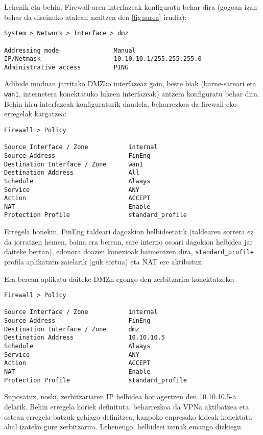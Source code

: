 Lehenik eta behin, Firewall-aren interfazeak konfiguratu behar dira (gogoan izan behar da diseinuko atalean azaltzen den \ref{fig:sarea} irudia):

\begin{verbatim}
System > Network > Interface > dmz

Addressing mode               Manual
IP/Netmask                    10.10.10.1/255.255.255.0
Administrative access         PING
\end{verbatim}

Adibide moduan jarritako DMZko interfazeaz gain, beste biak (barne-sareari eta \texttt{wan1}, internetera konektatuko lukeen interfazeak) antzera konfiguratu behar dira. Behin hiru interfazeak konfiguraturik daudela, beharrezkoa da firewall-eko erregelak kargatzea:

\begin{verbatim}
Firewall > Policy

Source Interface / Zone           internal
Source Address                    FinEng
Destination Interface / Zone      wan1
Destination Address               All               
Schedule                          Always
Service                           ANY
Action                            ACCEPT
NAT                               Enable 
Protection Profile                standard_profile
\end{verbatim}

Erregela honekin, FinEng taldeari dagozkion helbideetatik (taldearen sorrera ez da jorratzen hemen, baina era berean, sare interno osoari dagokion helbidea jar daiteke bertan), edonora doazen konexioak baimentzen dira, \texttt{standard\_profile} profila aplikatzen zaielarik (guk sortua) eta NAT ere aktibatuz.

Era berean aplikatu daiteke DMZn egongo den zerbitzarira konektatzeko:

\begin{verbatim}
Firewall > Policy

Source Interface / Zone           internal
Source Address                    FinEng
Destination Interface / Zone      dmz
Destination Address               10.10.10.5               
Schedule                          Always
Service                           ANY
Action                            ACCEPT
NAT                               Enable 
Protection Profile                standard_profile
\end{verbatim}

Suposatuz, noski, zerbitzariaren IP helbidea hor agertzen den 10.10.10.5-a delarik. Behin erregela horiek definituta, beharrezkoa da VPNa aktibatzea eta ostean erregela batzuk gehiago definitzea, kanpoko enpresako kideak konektatu ahal izateko gure zerbitzarira. Lehenengo, helbideei izenak emango dizkiegu.

